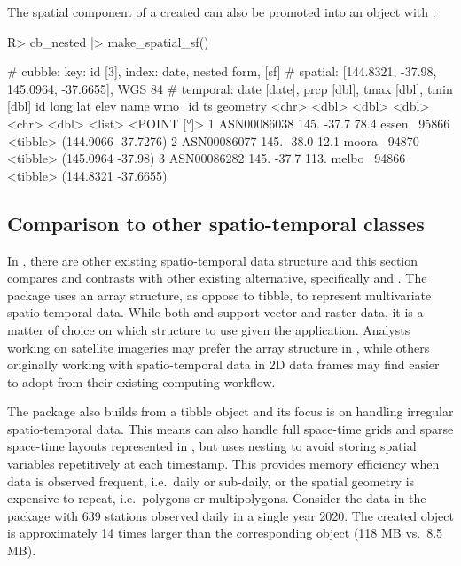 \documentclass[
  shortnames]{jss}
\begin{document}
The spatial component of a created  can also be promoted into an  object with :

\begin{CodeChunk}
\begin{CodeInput}
R> cb_nested |> make_spatial_sf() 
\end{CodeInput}
\begin{CodeOutput}
# cubble:   key: id [3], index: date, nested form, [sf]
# spatial:  [144.8321, -37.98, 145.0964, -37.6655], WGS 84
# temporal: date [date], prcp [dbl], tmax [dbl], tmin [dbl]
  id           long   lat  elev name   wmo_id ts                  geometry
  <chr>       <dbl> <dbl> <dbl> <chr>   <dbl> <list>           <POINT [°]>
1 ASN00086038  145. -37.7  78.4 essen~  95866 <tibble> (144.9066 -37.7276)
2 ASN00086077  145. -38.0  12.1 moora~  94870 <tibble>   (145.0964 -37.98)
3 ASN00086282  145. -37.7 113.  melbo~  94866 <tibble> (144.8321 -37.6655)
\end{CodeOutput}
\end{CodeChunk}

\hypertarget{tidyverse}{%
\subsection{Comparison to other spatio-temporal classes}\label{tidyverse}}

In , there are other existing spatio-temporal data structure and this section compares and contrasts  with other existing alternative, specifically  and . The  package \citep{stars} uses an array structure, as oppose to tibble, to represent multivariate spatio-temporal data. While both  and  support vector and raster data, it is a matter of choice on which structure to use given the application. Analysts working on satellite imageries may prefer the array structure in , while others originally working with spatio-temporal data in 2D data frames may find  easier to adopt from their existing computing workflow.

The  package \citep{sftime} also builds from a tibble object and its focus is on handling irregular spatio-temporal data. This means  can also handle full space-time grids and sparse space-time layouts represented in , but  uses nesting to avoid storing spatial variables repetitively at each timestamp. This provides memory efficiency when data is observed frequent, i.e.~daily or sub-daily, or the spatial geometry is expensive to repeat, i.e.~polygons or multipolygons. Consider the  data in the  package with 639 stations observed daily in a single year 2020. The created  object is approximately 14 times larger than the corresponding  object (118 MB vs.~8.5 MB).
\end{document}
